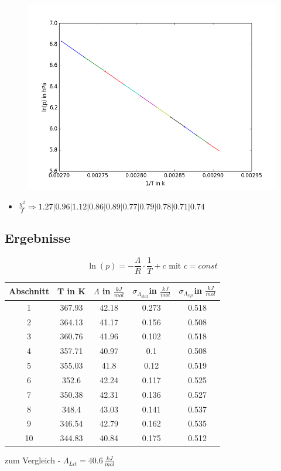 \documentclass[11pt]{beamer}
\begin{document}
\begin{frame}
\begin{figure}[H]
\centering
\includegraphics[scale=0.5]{Bilder/linreg_nurlinreg_EL.png}
\end{figure}
\begin{itemize}
\item $\frac{\chi^2}{f} \Rightarrow 1.27 | 0.96 | 1.12 | 0.86 | 0.89 | 0.77 | 0.79 | 0.78 | 0.71 | 0.74$
\end{itemize}
\end{frame}

\subsection{Ergebnisse}
\begin{frame}
\begin{equation*}
\ln(p)=-\frac{\Lambda}{R}\cdot \frac{1}{T}+c \text{ mit } c=const
\end{equation*}
\begin{table}[H]\centering
\begin{tabular}{c|c|c|c|c}
Abschnitt&T in K&$\Lambda$ in $\frac{kJ}{mol}$&$\sigma_{\Lambda_{stat}}$in $\frac{kJ}{mol}$&$\sigma_{\Lambda_{sys}}$in $\frac{kJ}{mol}$\\
\hline
1&367.93&42.18&0.273&0.518\\
2&364.13&41.17&0.156&0.508\\
3&360.76&41.96&0.102&0.518\\
4&357.71&40.97&0.1&0.508\\
5&355.03&41.8&0.12&0.519\\
6&352.6&42.24&0.117&0.525\\
7&350.38&42.31&0.136&0.527\\
8&348.4&43.03&0.141&0.537\\
9&346.54&42.79&0.162&0.535\\
10&344.83&40.84&0.175&0.512\\
\end{tabular}
\end{table}
zum Vergleich - $\Lambda_{Lit}=40.6\,\frac{kJ}{mol}$
\end{frame}
\end{document}
